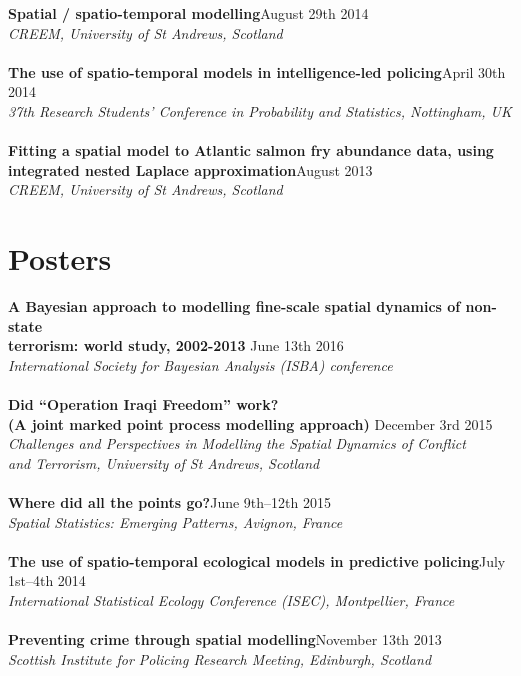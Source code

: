 \documentclass[10pt,letter]{article}
\begin{document}
 {\textbf{Spatial / spatio-temporal modelling}}\hfill August 29th 2014\\
 {\sl CREEM, University of St Andrews, Scotland}\\
 \hdashrule[0.5ex]{4cm}{1pt}{1pt}\\
{\textbf{The use of spatio-temporal models in intelligence-led policing}}\hfill  April 30th 2014\\
 {\sl 37th Research Students' Conference in Probability and Statistics, Nottingham, UK}\\
 \hdashrule[0.5ex]{4cm}{1pt}{1pt}\\
{\textbf{Fitting a spatial model to Atlantic salmon fry abundance data, using\\ integrated nested Laplace approximation}}\hfill  August 2013\\
 {\sl CREEM, University of St Andrews, Scotland}\\ 
\newpage
 \vspace{-1mm}

\section*{Posters}
\vspace{1mm}

{\textbf {A Bayesian approach to modelling fine-scale spatial dynamics of non-state\\
 terrorism: world study, 2002-2013 }}\hfill June 13th 2016\\
 {\sl International Society for Bayesian Analysis (ISBA) conference}\\
 \hdashrule[0.5ex]{4cm}{1pt}{1pt}\\
 {\textbf{Did ``Operation Iraqi Freedom'' work? \\
(A joint marked point process modelling approach) }}\hfill December 3rd 2015\\
 {\sl Challenges and Perspectives in Modelling the Spatial Dynamics of Conflict\\ and Terrorism, University of St Andrews, Scotland}\\
 \hdashrule[0.5ex]{4cm}{1pt}{1pt}\\
{\textbf{Where did all the points go?}}\hfill June 9th--12th 2015\\
 {\sl Spatial Statistics: Emerging Patterns, Avignon, France}\\
\hdashrule[0.5ex]{4cm}{1pt}{1pt}\\
 {\textbf{The use of spatio-temporal ecological models in predictive policing}}\hfill July 1st--4th 2014\\
 {\sl International Statistical Ecology Conference (ISEC), Montpellier, France}\\
 \hdashrule[0.5ex]{4cm}{1pt}{1pt}\\
{\textbf{Preventing crime through spatial modelling}}\hfill November 13th 2013\\
 {\sl Scottish Institute for Policing Research Meeting, Edinburgh, Scotland}\\
\end{document}
